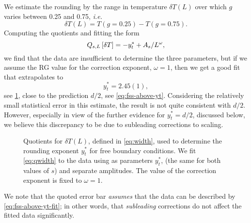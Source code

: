 We estimate the rounding by the range in temperature $\delta T(L)$ over which
$g$ varies between 0.25 and 0.75, \emph{i.e.}
\begin{equation}
  \delta T(L) = T(g=0.25) - T(g=0.75).
  \label{eq:width}
\end{equation}
Computing the quotients and fitting the form
\begin{equation}
  Q_{s,L}\left[\delta T\right] = -y_t^* + A_s/L^{\omega},
  \label{eq:qwidth}
\end{equation}
we find that the data are insufficient to determine the three parameters, but
if we assume the RG value for the correction exponent, $\omega=1$, then we get
a good fit that extrapolates to
\begin{equation}
  y_t^* = 2.45(1),
  \label{eq:fss-above-yt-fit}
\end{equation}
see \cref{fig:qwidth}, close to the prediction $d/2$, see
\cref{eq:fss-above-yt}. Considering the relatively small statistical error in
this estimate, the result is not quite consistent with $d/2$. However,
especially in view of the further evidence for $y_t^*=d/2$, discussed below, we
believe this discrepancy to be due to subleading corrections to scaling.
\begin{figure}
  \centering
  
  \caption[
    Quotient estimation of the width exponent $y_t^*$ for $k=0$ modes of the
    five-dimensional Ising model with free boundary conditions.
  ]
  {
    Quotients for $\delta T(L)$, defined in \cref{eq:width}, used to
    determine the rounding exponent $y_t^*$ for free boundary conditions. We fit
    \cref{eq:qwidth} to the data using as parameters $y_t^*$, (the same
    for both values of $s$) and separate amplitudes. The value of the
    correction exponent is fixed to $\omega=1$.
  } \label{fig:qwidth}
\end{figure}
We note that the quoted error bar \emph{assumes} that the data can be described
by \cref{eq:fss-above-yt-fit}; in other words, that \emph{subleading}
corrections do not affect the fitted data significantly.

